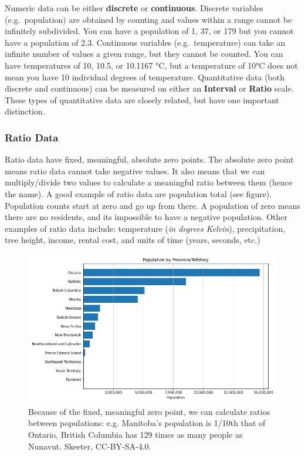 \documentclass[
]{book}
\begin{document}
Numeric data can be either \textbf{discrete} or \textbf{continuous}. Discrete variables (e.g.~population) are obtained by counting and values within a range cannot be infinitely subdivided. You can have a population of 1, 37, or 179 but you cannot have a population of 2.3. Continuous variables (e.g.~temperature) can take an infinite number of values a given range, but they cannot be counted. You can have temperatures of 10, 10.5, or 10.1167 °C, but a temperature of 10°C does not mean you have 10 individual degrees of temperature. Quantitative data (both discrete and continuous) can be measured on either an \textbf{Interval} or \textbf{Ratio} scale. These types of quantitative data are closely related, but have one important distinction.

\subsubsection{Ratio Data}\label{ratio-data}

Ratio data have fixed, meaningful, absolute zero points. The absolute zero point means ratio data cannot take negative values. It also means that we can multiply/divide two values to calculate a meaningful ratio between them (hence the name). A good example of ratio data are population total (see figure). Population counts start at zero and go up from there. A population of zero means there are no residents, and its impossible to have a negative population. Other examples of ratio data include: temperature (\emph{in degrees Kelvin}), precipitation, tree height, income, rental cost, and units of time (years, seconds, etc.)

\begin{figure}
\includegraphics[width=0.75\linewidth]{images/03-ratio-population} \caption{Because of the fixed, meaningful zero point, we can calculate ratios between populations: e.g. Manitoba's population is 1/10th that of Ontario, British Columbia has 129 times as many people as Nunavut. Skeeter, CC-BY-SA-4.0.}\label{fig:3-ratio-population}
\end{figure}
\end{document}
